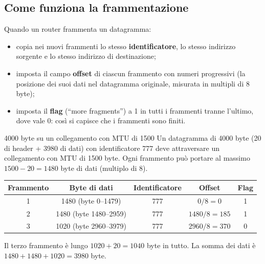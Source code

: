 \subsection{Come funziona la frammentazione}

Quando un router frammenta un datagramma:

\begin{itemize}
    \item copia nei nuovi frammenti lo stesso \textbf{identificatore}, lo stesso indirizzo sorgente e lo stesso indirizzo di destinazione;
    \item imposta il campo \textbf{offset} di ciascun frammento con numeri progressivi (la posizione dei suoi dati nel
          datagramma originale, misurata in multipli di 8 byte);
    \item imposta il \textbf{flag} (``more fragments'') a 1 in tutti i frammenti tranne l'ultimo, dove vale 0: così si capisce
          che i frammenti sono finiti.
\end{itemize}

\begin{esempio}{4000 byte su un collegamento con MTU di 1500}
Un datagramma di 4000 byte (20 di header + 3980 di dati) con identificatore 777 deve attraversare un collegamento con MTU
di 1500 byte. Ogni frammento può portare al massimo $1500 - 20 = 1480$ byte di dati (multiplo di 8).
\begin{center}
\begin{tabular}{ccccc}
\toprule
\textbf{Frammento} & \textbf{Byte di dati} & \textbf{Identificatore} & \textbf{Offset} & \textbf{Flag} \\
\midrule
1 & 1480 (byte 0--1479) & 777 & $0/8 = 0$ & 1 \\
2 & 1480 (byte 1480--2959) & 777 & $1480/8 = 185$ & 1 \\
3 & 1020 (byte 2960--3979) & 777 & $2960/8 = 370$ & 0 \\
\bottomrule
\end{tabular}
\end{center}
Il terzo frammento è lungo $1020 + 20 = 1040$ byte in tutto. La somma dei dati è $1480 + 1480 + 1020 = 3980$ byte.
\end{esempio}


